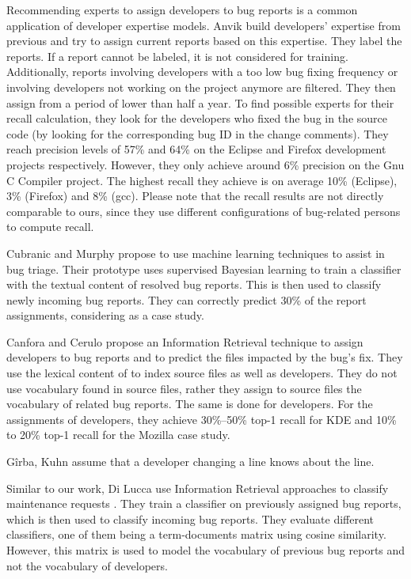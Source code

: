 Recommending experts to assign developers to bug reports is a common application of developer expertise models.
Anvik \etal \cite{Anvi06a} build developers' expertise from previous \BRs and try to assign current reports based on this expertise. They label the reports. If a report cannot be labeled, it is not considered for training. Additionally, reports involving developers with a too low bug fixing frequency or involving developers not working on the project anymore are filtered. They then assign \BRs from a period of lower than half a year. To find possible experts for their recall calculation, they look for the developers who fixed the bug in the source code (by looking for the corresponding bug ID in the change comments). They reach precision levels of 57\% and 64\% on the Eclipse and Firefox development projects respectively. However, they only achieve around 6\% precision on the Gnu C Compiler project. The highest recall they achieve is on average 10\% (Eclipse), 3\% (Firefox) and 8\% (gcc). Please note that the recall results are not directly comparable to ours, since they use different configurations of bug-related persons to compute recall.

Cubranic and Murphy \cite{Cubr04b} propose to use machine learning techniques to assist in bug triage. Their prototype uses supervised Bayesian learning to train a classifier with the textual content of resolved bug reports. This is then used to classify newly incoming bug reports. They can correctly predict 30\% of the report assignments, considering \EC as a case study.

Canfora and Cerulo \cite{Canf05a} propose an Information Retrieval technique to assign developers to bug reports and to predict the files impacted by the bug's fix. They use the lexical content of \BRs to index source files as well as developers. They do not use vocabulary found in source files, rather they assign to source files the vocabulary of related bug reports. The same is done for developers. For the assignments of developers, they achieve 30\%--50\% top-1 recall for KDE and 10\% to 20\% top-1 recall for the Mozilla case study.

G\^irba, Kuhn \etal\cite{Girb05c} assume that a developer changing a line knows about the line.

Similar to our work, Di Lucca \etal use Information Retrieval approaches to classify maintenance requests \cite{Lucc02b}. They train a classifier on previously assigned bug reports, which is then used to classify incoming bug reports. They evaluate different classifiers, one of them being a term-documents matrix using cosine similarity. However, this matrix is used to model the vocabulary of previous bug reports and not the vocabulary of developers.

